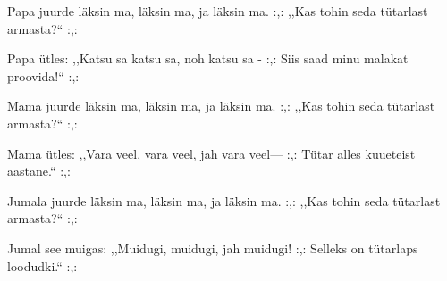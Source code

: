 Papa juurde l\"aksin ma,
l\"aksin ma, ja l\"aksin ma.
:,: ,,Kas tohin seda t\"utarlast armasta?{``} :,: 

Papa \"utles: ,,Katsu sa
katsu sa, noh katsu sa -
:,: Siis saad minu malakat proovida!{``} :,: 

Mama juurde l\"aksin ma,
l\"aksin ma, ja l\"aksin ma.
:,: ,,Kas tohin seda t\"utarlast armasta?{``} :,: 

Mama \"utles: ,,Vara veel,
vara veel, jah vara veel---
:,: T\"utar alles kuueteist aastane.{``} :,: 

Jumala juurde l\"aksin ma,
l\"aksin ma, ja l\"aksin ma.
:,: ,,Kas tohin seda t\"utarlast armasta?{``} :,: 

Jumal see muigas: ,,Muidugi,
muidugi, jah muidugi!
:,: Selleks on t\"utarlaps loodudki.{``} :,: 